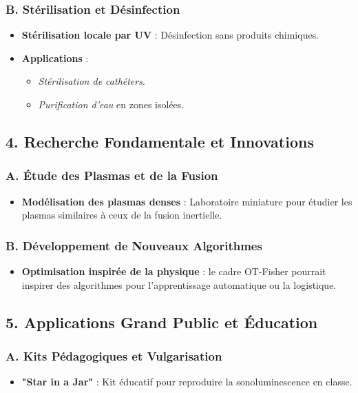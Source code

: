 \documentclass[a4paper,12pt]{article}
\begin{document}
\subsubsection*{B. Stérilisation et Désinfection}
\begin{itemize}
    \item \textbf{Stérilisation locale par UV} : Désinfection sans produits chimiques.
    \item \textbf{Applications} :
    \begin{itemize}
        \item \textit{Stérilisation de cathéters}.
        \item \textit{Purification d’eau} en zones isolées.
    \end{itemize}
\end{itemize}

\subsection*{4. Recherche Fondamentale et Innovations}
\subsubsection*{A. Étude des Plasmas et de la Fusion}
\begin{itemize}
    \item \textbf{Modélisation des plasmas denses} : Laboratoire miniature pour étudier les plasmas similaires à ceux de la fusion inertielle.
\end{itemize}

\subsubsection*{B. Développement de Nouveaux Algorithmes}
\begin{itemize}
    \item \textbf{Optimisation inspirée de la physique} : le cadre OT-Fisher pourrait inspirer des algorithmes pour l’apprentissage automatique ou la logistique.
\end{itemize}

\subsection*{5. Applications Grand Public et Éducation}
\subsubsection*{A. Kits Pédagogiques et Vulgarisation}
\begin{itemize}
    \item \textbf{"Star in a Jar"} : Kit éducatif pour reproduire la sonoluminescence en classe.
\end{itemize}
\end{document}
